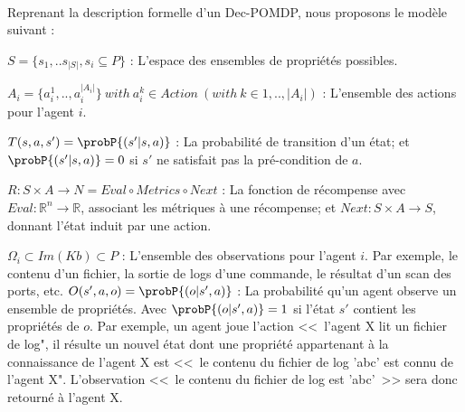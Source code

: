 \

Reprenant la description formelle d'un Dec-POMDP\cite{OliehoekA16}, nous proposons le modèle suivant :

$S = \{s_1, ..s_{|S|}, s_{i} \subseteq P\}$ : L'espace des ensembles de propriétés possibles.

$A_i = \{a_{i}^{1},..,a_{i}^{|A_{i}|}\} \: with \: a_{i}^k \in Action \: (with \: k \in {1, .., |A_i|})$ : L'ensemble des actions pour l'agent $i$.

$T(s,a,s') = \probP{(s'|s,a)}$ : La probabilité de transition d'un état; et $\probP{(s'|s,a)} = 0$ si $s'$ ne satisfait pas la pré-condition de $a$.

$R: S \times A \rightarrow N = Eval \circ Metrics \circ Next$ : La fonction de récompense avec $Eval: \mathbb{R}^n \rightarrow \mathbb{R}$, associant les métriques à une récompense; et $Next: S \times A \rightarrow S$, donnant l'état induit par une action.

$\Omega_i \subset Im(Kb) \subset P$ : L'ensemble des observations pour l'agent $i$. Par exemple, le contenu d'un fichier, la sortie de logs d'une commande, le résultat d'un scan des ports, etc.
$O(s',a,o) = \probP{(o|s',a)}$ : La probabilité qu'un agent observe un ensemble de propriétés. Avec $\probP{(o|s',a)} = 1$ si l'état $s'$ contient les propriétés de $o$.
Par exemple, un agent joue l'action <<~l'agent X lit un fichier de log", il résulte un nouvel état dont une propriété appartenant à la connaissance de l'agent X est <<~le contenu du fichier de log 'abc' est connu de l'agent X". L'observation <<~le contenu du fichier de log est 'abc'~>> sera donc retourné à l'agent X.

\












